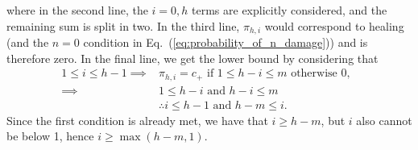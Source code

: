 where in the second line, the $i=0, h$ terms are explicitly considered, and the remaining sum is split in two. In the third line, $\pi_{h, i}$ would correspond to healing (and the $n=0$ condition in Eq.~(\ref{eq:probability_of_n_damage})) and is therefore zero. In the final line, we get the lower bound by considering that 
\begin{align}
	1\leq i \leq h-1 \implies& \pi_{h, i} = c_+ \text{ if } 1\leq h - i \leq m \text{ otherwise } 0,\,\,\, \\
	\implies& 1\leq h - i \text{ and } h - i \leq m\\
	&\therefore  i\leq h - 1 \text{ and } h - m \leq i.
\end{align}
Since the first condition is already met, we have that $i \geq h - m$, but $i$ also cannot be below 1, hence $i\geq \max(h - m, 1)$. 







